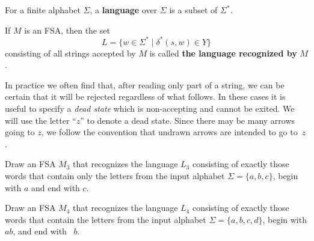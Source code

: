 \begin{dfn}
For a finite alphabet $\Sigma$, a \textbf{language} over $\Sigma$ is a subset of\/ $\Sigma^*$.
\end{dfn}

\begin{dfn}
If $M$ is an FSA, then the set$$L = \{w\in \Sigma^* \mid \delta^*(s,w)\in Y\}$$ consisting of all strings accepted by $M$ is called \textbf{the language recognized by} $M$.
\end{dfn}

In practice we often find that, after reading only part of a string, we can be certain that it will be rejected regardless of what follows.  In these cases it is useful to specify a  \emph{dead state} which is non-accepting and cannot be exited.  We will use the letter ``$z$'' to denote a dead state.   Since there may be many arrows going to $z$, we follow the convention that undrawn arrows are intended to go to~$z$.

\begin{expl}\label{ex:L3}
Draw an FSA $M_3$ that recognizes the language $L_3$ consisting of exactly those words that contain only the letters from the input alphabet $\Sigma = \{a,b,c\}$, begin with $a$ and end with $c$.
\begin{annotation}
\end{annotation}
\end{expl}

\begin{prb} \label{prob:L4}
Draw an FSA $M_4$ that recognizes the language $L_4$ consisting of exactly those words that contain the letters from the input alphabet $\Sigma = \{a,b,c,d\}$, begin with $ab$, and end with ~$b$.
\end{prb}

